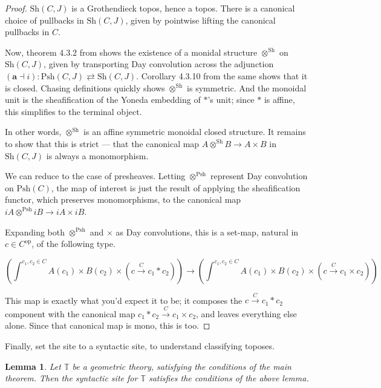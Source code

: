 \documentclass{article}
\newtheorem{lemma}[theorem]{Lemma}
\newcommand*{\Sh}{\mathrm{Sh}}
\newcommand*{\Psh}{\mathrm{Psh}}
\newcommand*{\T}{\mathbb{T}}
\begin{document}
\begin{proof}
    \(\Sh(C,J)\) is a Grothendieck topos, hence a topos. There is a canonical choice of pullbacks in \(\Sh(C,J)\), given by pointwise lifting the canonical pullbacks in \(C\).

    Now, theorem 4.3.2 from \cite{biering} shows the existence of a monidal structure \(\otimes^\Sh\) on \(\Sh(C,J)\),
    given by transporting Day convolution across the adjunction \((\mathbf{a} \dashv i) : \Psh(C,J) \rightleftarrows \Sh(C,J)\).
    Corollary 4.3.10 from the same shows that it is closed.
    Chasing definitions quickly shows \(\otimes^\Sh\) is symmetric.
    And the monoidal unit is the sheafification of the Yoneda embedding of \(*\)'s unit;
    since \(*\) is affine, this simplifies to the terminal object.

    In other words, \(\otimes^\Sh\) is an affine symmetric monoidal closed structure.
    It remains to show that this is strict --- that the canonical map \(A \otimes^\Sh B \to A \times B\) in \(\Sh(C,J)\) is always a monomorphism.

    We can reduce to the case of presheaves.
    Letting \(\otimes^\Psh\) represent Day convolution on \(\Psh(C)\),
    the map of interest is just the result of applying the sheafification functor, which preserves monomorphisms, to the canonical map \(iA \otimes^\Psh iB \to iA \times iB\).

    Expanding both \(\otimes^\Psh\) and \(\times\) as Day convolutions,
    this is a set-map, natural in \(c \in C^\mathrm{op}\), of the following type.
    \begin{scriptsize}\[\left(\int^{c_1,c_2 \in C} A(c_1) \times B(c_2) \times (c \xrightarrow{C} c_1 * c_2)\right) \to \left(\int^{c_1,c_2 \in C} A(c_1) \times B(c_2) \times (c \xrightarrow{C} c_1 \times c_2)\right)\]\end{scriptsize}
    This map is exactly what you'd expect it to be; it composes the \(c \xrightarrow{C} c_1 * c_2\) component
    with the canonical map \(c_1 * c_2 \xrightarrow{C} c_1 \times c_2\), and leaves everything else alone.
    Since that canonical map is mono, this is too.
\end{proof}

Finally, set the site to a syntactic site, to understand classifying toposes.

\begin{lemma}
    Let \(\T\) be a geometric theory, satisfying the conditions of the main theorem.
    Then the syntactic site for \(\T\) satisfies the conditions of the above lemma.
\end{lemma}
\end{document}
